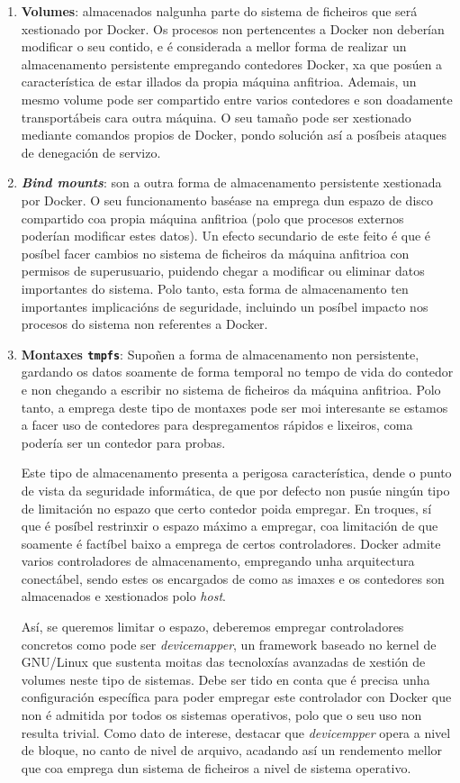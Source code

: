 \begin{enumerate}
    \item \textbf{Volumes}: almacenados nalgunha parte do sistema de ficheiros que será xestionado por Docker. Os procesos non pertencentes a Docker non deberían modificar o seu contido, e é considerada a mellor forma de realizar un almacenamento persistente empregando contedores Docker, xa que posúen a característica de estar illados da propia máquina anfitrioa. Ademais, un mesmo volume pode ser compartido entre varios contedores e son doadamente transportábeis cara outra máquina. O seu tamaño pode ser xestionado mediante comandos propios de Docker, pondo solución así a posíbeis ataques de denegación de servizo.
    \item \textbf{\textit{Bind mounts}}: son a outra forma de almacenamento persistente xestionada por Docker. O seu funcionamento baséase na emprega dun espazo de disco compartido coa propia máquina anfitrioa (polo que procesos externos poderían modificar estes datos). Un efecto secundario de este feito é que é posíbel facer cambios no sistema de ficheiros da máquina anfitrioa con permisos de superusuario, puidendo chegar a modificar ou eliminar datos importantes do sistema. Polo tanto, esta forma de almacenamento ten importantes implicacións de seguridade, incluindo un posíbel impacto nos procesos do sistema non referentes a Docker.
    \item \textbf{Montaxes {\tt tmpfs}}: Supoñen a forma de almacenamento non persistente, gardando os datos soamente de forma temporal no tempo de vida do contedor e non chegando a escribir no sistema de ficheiros da máquina anfitrioa. Polo tanto, a emprega deste tipo de montaxes pode ser moi interesante se estamos a facer uso de contedores para despregamentos rápidos e lixeiros, coma podería ser un contedor para probas.
    
    Este tipo de almacenamento presenta a perigosa característica, dende o punto de vista da seguridade informática, de que por defecto non pusúe ningún tipo de limitación no espazo que certo contedor poida empregar. En troques, sí que é posíbel restrinxir o espazo máximo a empregar, coa limitación de que soamente é factíbel baixo a emprega de certos controladores. Docker admite varios controladores de almacenamento, empregando unha arquitectura conectábel, sendo estes os encargados de como as imaxes e os contedores son almacenados e xestionados polo \textit{host}.
    
    Así, se queremos limitar o espazo, deberemos empregar controladores concretos como pode ser \textit{devicemapper}, un framework baseado no kernel de GNU/Linux que sustenta moitas das tecnoloxías avanzadas de xestión de volumes neste tipo de sistemas. Debe ser tido en conta que é precisa unha configuración específica para poder empregar este controlador con Docker que non é admitida por todos os sistemas operativos, polo que o seu uso non resulta trivial. Como dato de interese, destacar que \textit{devicempper} opera a nivel de bloque, no canto de nivel de arquivo, acadando así un rendemento mellor que coa emprega dun sistema de ficheiros a nivel de sistema operativo.
    

\end{enumerate}
